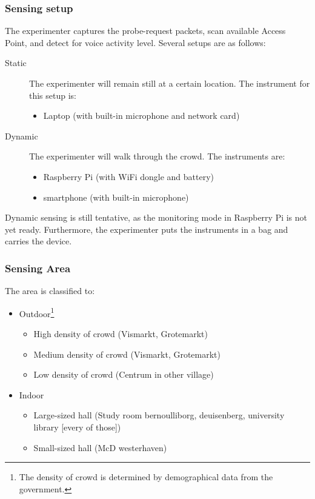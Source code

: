 \documentclass{article}
\begin{document}
\subsubsection*{Sensing setup} %
The experimenter captures the probe-request packets, scan available Access Point, and detect for voice activity level. Several setups are as follows:

\label{ssub:sensing_setup}
\begin{description}
	\item[Static] The experimenter will remain still at a certain location. The instrument for this setup is:
	\begin{itemize}
		\item Laptop (with built-in microphone and network card)
	\end{itemize}

	\item[Dynamic] The experimenter will walk through the crowd. The instruments are:
	\begin{itemize}
		\item Raspberry Pi (with WiFi dongle and battery)
		\item smartphone (with built-in microphone)
	\end{itemize}
\end{description}

Dynamic sensing is still tentative, as the monitoring mode in Raspberry Pi is not yet ready. Furthermore, the experimenter puts the instruments in a bag and carries the device.

\subsubsection*{Sensing Area} %
\label{ssub:sensing_area}
The area is classified to:
\begin{itemize}
	\item Outdoor\footnote{The density of crowd is determined by demographical data from the government.}
	\begin{itemize}
		\item High density of crowd (Vismarkt, Grotemarkt)
		\item Medium density of crowd (Vismarkt, Grotemarkt)
		\item Low density of crowd (Centrum in other village)
	\end{itemize}
	
	\item Indoor
	\begin{itemize}
		\item Large-sized hall (Study room bernoulliborg, deuisenberg, university library [every of those])
		\item Small-sized hall (McD westerhaven)
	\end{itemize}
\end{itemize}
\end{document}
